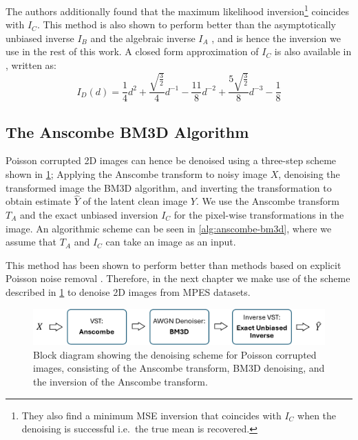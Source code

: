 The authors additionally found that the maximum likelihood inversion\footnote{They also find a minimum \gls{MSE} inversion that coincides with $I_C$ when the denoising is successful i.e.\ the true mean is recovered.} coincides with $I_C$. This method is also shown to perform better than the asymptotically unbiased inverse $I_B$ and the algebraic inverse $I_A$ \cite{makitaloOptimalInversionAnscombe2011}, and is hence the inversion we use in the rest of this work.
A closed form approximation of $I_C$ is also available in \cite{makitaloClosedFormApproximationExact2011}, written as:
\begin{equation}
    I_D(d) = \frac{1}{4} d^2 + \frac{\sqrt{\frac{3}{2}}}{4} d^{-1} - \frac{11}{8} d^{-2} + \frac{5 \sqrt{\frac{3}{2}}}{8} d^{-3} - \frac{1}{8}
\end{equation}

\subsection{The Anscombe BM3D Algorithm}
Poisson corrupted 2D images can hence be denoised using a three-step scheme shown in \cref{fig:anscombe-bm3d}; Applying the Anscombe transform to noisy image $X$, denoising the transformed image the \gls{BM3D} algorithm, and inverting the transformation to obtain estimate $\hat{Y}$ of the latent clean image $Y$. We use the Anscombe transform $T_A$ and the exact unbiased inversion $I_C$ for the pixel-wise transformations in the image. An algorithmic scheme can be seen in \cref{alg:anscombe-bm3d}, where we assume that $T_A$ and $I_C$ can take an image as an input.

This method has been shown to perform better than methods based on explicit Poisson noise removal \cite{makitaloOptimalInversionAnscombe2011}. Therefore, in the next chapter we make use of the scheme described in \cref{fig:anscombe-bm3d} to denoise 2D images from \gls{MPES} datasets.

\begin{figure} 
    \centering
    \includegraphics[width=1\linewidth]{images/bm3d_anscombe_scheme.pdf}
    \caption{Block diagram showing the denoising scheme for Poisson corrupted images, consisting of the Anscombe transform, BM3D denoising, and the inversion of the Anscombe transform.}
    \label{fig:anscombe-bm3d}
\end{figure}

